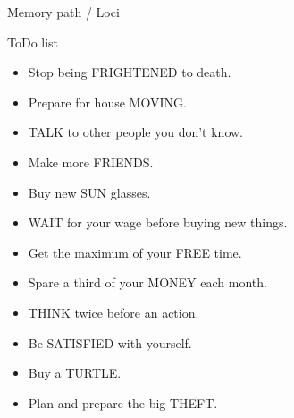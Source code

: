 \begin{frame}{Memory path / Loci}
  \begin{block}{ToDo list}
    \begin{itemize}
      \item Stop being FRIGHTENED to death.
      \item Prepare for house MOVING. 
      \item TALK to other people you don't know.
      \item Make more FRIENDS.
      \item Buy new SUN glasses. 
      \item WAIT for your wage before buying new things. 
      \item Get the maximum of your FREE time. 
      \item Spare a third of your MONEY each month. 
      \item THINK twice before an action. 
      \item Be SATISFIED with yourself. 
      \item Buy a TURTLE. 
      \item Plan and prepare the big THEFT. 
    \end{itemize}
  \end{block}
\end{frame}

